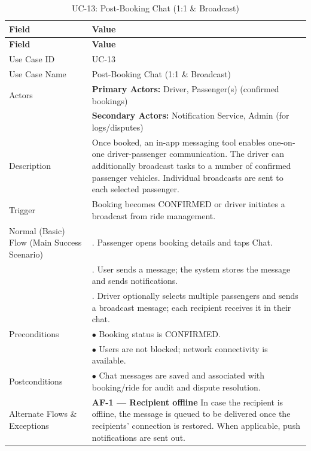 \begin{longtable}{|>{\raggedright\arraybackslash}p{4cm}|>{\raggedright\arraybackslash}p{11cm}|}
\caption{UC-13: Post-Booking Chat (1:1 \& Broadcast)}
\label{tab:uc-13} \\
\hline
\rowcolor{lightgray!30}
\textbf{Field} & \textbf{Value} \\
\hline
\endfirsthead
\hline
\rowcolor{lightgray!30}
\textbf{Field} & \textbf{Value} \\
\hline
\endhead
\hline
\endfoot
\hline
\endlastfoot
Use Case ID & UC-13 \\
\hline
Use Case Name & Post-Booking Chat (1:1 \& Broadcast) \\
\hline
Actors & \textbf{Primary Actors:} Driver, Passenger(s) (confirmed bookings) \\
& \textbf{Secondary Actors:} Notification Service, Admin (for logs/disputes) \\
\hline
Description & Once booked, an in-app messaging tool enables one-on-one driver-passenger communication. The driver can additionally broadcast tasks to a number of confirmed passenger vehicles. Individual broadcasts are sent to each selected passenger. \\
\hline
Trigger & Booking becomes CONFIRMED or driver initiates a broadcast from ride management. \\
\hline
Normal (Basic) Flow (Main Success Scenario) & 1. Passenger opens booking details and taps Chat. \\
& 2. User sends a message; the system stores the message and sends notifications. \\
& 3. Driver optionally selects multiple passengers and sends a broadcast message; each recipient receives it in their chat. \\
\hline
Preconditions & $\bullet$ Booking status is CONFIRMED. \\
& $\bullet$ Users are not blocked; network connectivity is available. \\
\hline
Postconditions & $\bullet$ Chat messages are saved and associated with booking/ride for audit and dispute resolution. \\
\hline
Alternate Flows \& Exceptions & \textbf{AF-1 — Recipient offline} \newline In case the recipient is offline, the message is queued to be delivered once the recipients' connection is restored. When applicable, push notifications are sent out. \\

\end{longtable}
